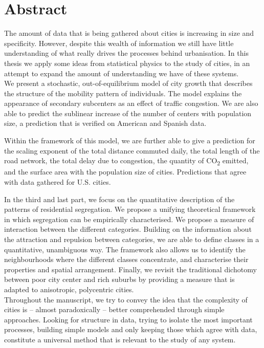 

\begingroup
\let\clearpage\relax
\let\cleardoublepage\relax
\let\cleardoublepage\relax

\chapter*{Abstract} %


The amount of data that is being gathered about cities is increasing in size and
specificity. However, despite this wealth of information we still have little
understanding of what really drives the processes behind urbanisation. In this
thesis we apply some ideas from statistical physics to the study of cities, in
an attempt to expand the amount of understanding we have of these systems.\\ 



We present a stochastic, out-of-equilibrium model of city growth that describes
the structure of the mobility pattern of individuals. The model explains the
appearance of secondary subcenters as an effect of traffic congestion. We are
also able to predict the sublinear increase of the number of centers with
population size, a prediction that is verified on American and Spanish data. 

Within the framework of this model, we are further able to give a prediction for the
scaling exponent of the total distance commuted daily, the total length of the
road network, the total delay due to congestion, the quantity of
CO\textsubscript{2} emitted, and the surface area with the population size of
cities. Predictions that agree with data gathered for U.S. cities.

In the third and last part, we focus on the quantitative description of the
patterns of residential segregation. We propose a unifying theoretical framework
in which segregation can be empirically characterised. We propose a measure of
interaction between the different categories. Building on the information about
the attraction and repulsion between categories, we are able to define classes
in a quantitative, unambiguous way. The framework also allows us to identify the
neighbourhoods where the different classes concentrate, and characterise their
properties and spatial arrangement. Finally, we revisit the traditional
dichotomy between poor city center and rich suburbs by providing a measure that
is adapted to anisotropic, polycentric cities.\\


Throughout the manuscript, we try to convey the idea that the complexity of cities is --
almost paradoxically -- better comprehended through simple approaches. 
Looking for structure in data, trying to isolate the most important processes,
building simple models and only keeping those which agree with data, constitute
a universal method that is relevant to the study of any system.


\endgroup			

\vfill
